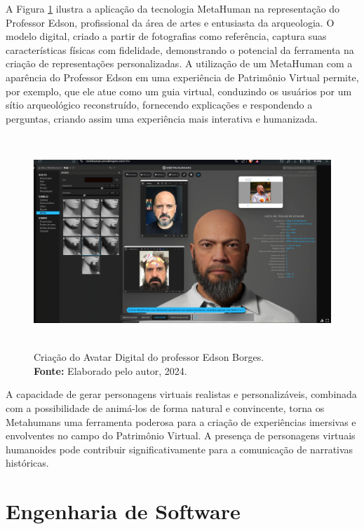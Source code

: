 A Figura \ref{fig:metahumanEdson} ilustra a aplicação da tecnologia MetaHuman na representação do Professor Edson, profissional da área de artes e entusiasta da arqueologia. O modelo digital, criado a partir de fotografias como referência, captura suas características físicas com fidelidade, demonstrando o potencial da ferramenta na criação de representações personalizadas. A utilização de um MetaHuman com a aparência do Professor Edson em uma experiência de Patrimônio Virtual permite, por exemplo, que ele atue como um guia virtual, conduzindo os usuários por um sítio arqueológico reconstruído, fornecendo explicações e respondendo a perguntas, criando assim uma experiência mais interativa e humanizada.

\begin{figure}[H]
    \centering
    \includegraphics[height=8cm, keepaspectratio]{img/Metahuman.png}
    \caption{Criação do Avatar Digital do professor Edson Borges. \\
        \textbf{Fonte:} Elaborado pelo autor, 2024.}
    \label{fig:metahumanEdson}
\end{figure}



A capacidade de gerar personagens virtuais realistas e personalizáveis, combinada com a possibilidade de animá-los de forma natural e convincente, torna os Metahumans uma ferramenta poderosa para a criação de experiências imersivas e envolventes no campo do Patrimônio Virtual. A presença de personagens virtuais humanoides pode contribuir significativamente para a comunicação de narrativas históricas.

\section{Engenharia de Software}

